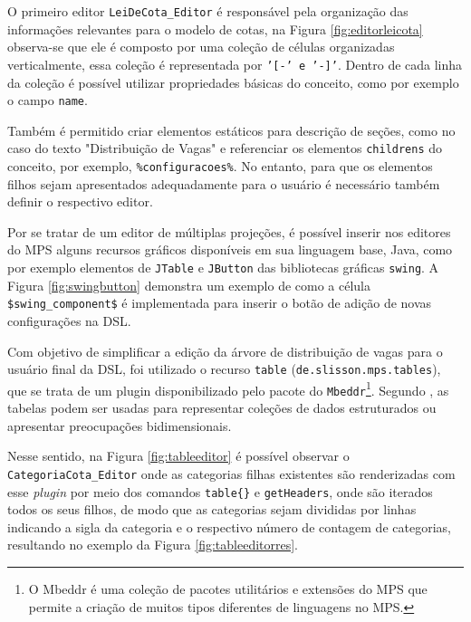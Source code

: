 O primeiro editor \texttt{LeiDeCota\_Editor} é responsável pela organização das informações relevantes para o modelo de cotas, na Figura \ref{fig:editorleicota} observa-se que ele é composto por uma coleção de células organizadas verticalmente, essa coleção é representada por \texttt{'[-' e '-]'}. Dentro de cada linha da coleção é possível utilizar propriedades básicas do conceito, como por exemplo o campo \texttt{name}. 




\newpage
Também é permitido criar elementos estáticos para descrição de seções, como no caso do texto "Distribuição de Vagas" e referenciar os elementos \texttt{childrens} do conceito, por exemplo, \texttt{\%configuracoes\%}. No entanto, para que os elementos filhos sejam apresentados adequadamente para o usuário é necessário também definir o respectivo editor. 

Por se tratar de um editor de múltiplas projeções, é possível inserir nos editores do \gls{MPS} alguns recursos gráficos disponíveis em sua linguagem base, Java, como por exemplo elementos de \texttt{JTable} e \texttt{JButton} das bibliotecas gráficas \texttt{swing}. A Figura \ref{fig:swingbutton} demonstra um exemplo de como a célula \texttt{\$swing\_component\$} é implementada para inserir o botão de adição de novas configurações na DSL.



Com objetivo de simplificar a edição da árvore de distribuição de vagas para o usuário final da DSL, foi utilizado o recurso \texttt{table} (\texttt{de.slisson.mps.tables}), que se trata de um plugin disponibilizado pelo pacote do \texttt{Mbeddr}\footnote{O Mbeddr é uma coleção de pacotes utilitários e extensões do MPS que permite a criação de muitos tipos diferentes de linguagens no \gls{MPS}.}. Segundo , as tabelas podem ser usadas para representar coleções de dados estruturados ou apresentar preocupações bidimensionais.

Nesse sentido, na Figura \ref{fig:tableeditor} é possível observar o \texttt{CategoriaCota\_Editor} onde as categorias filhas existentes são renderizadas com esse \textit{plugin} por meio dos comandos \texttt{table\{\}} e \texttt{getHeaders}, onde são iterados todos os seus filhos, de modo que as categorias sejam divididas por linhas indicando a sigla da categoria e o respectivo número de contagem de categorias, resultando no exemplo da Figura \ref{fig:tableeditorres}.

